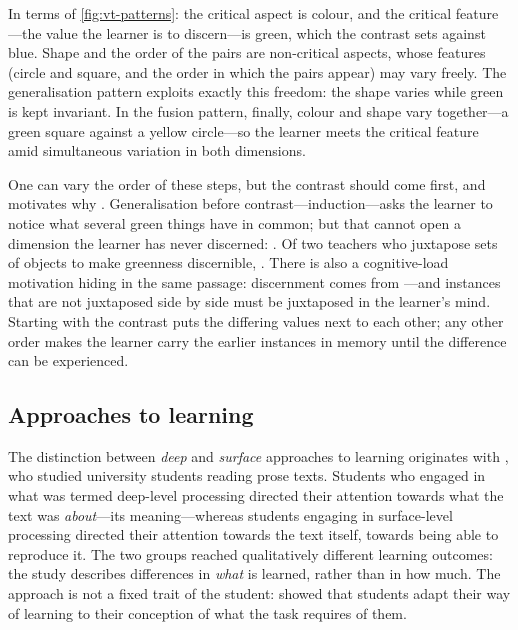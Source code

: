 In terms of \cref{fig:vt-patterns}: the critical aspect is colour, and the critical
feature---the value the learner is to discern---is green, which the
contrast sets against blue.
Shape and the order of the pairs are non-critical aspects, whose features
(circle and square, and the order in which the pairs appear) may vary freely.
The generalisation pattern exploits exactly this freedom: the shape varies
while green is kept invariant.
In the fusion pattern, finally, colour and shape vary together---a green
square against a yellow circle---so the learner meets the critical feature
amid simultaneous variation in both dimensions.

One can vary the order of these steps, but the contrast should come first,
and \citeauthor{NCOL} motivates why \autocite[pp.~45--47]{NCOL}.
Generalisation before contrast---induction---asks the learner to notice
what several green things have in common; but that cannot open a dimension
the learner has never discerned:
.
Of two teachers who juxtapose sets of objects to make greenness discernible,
.
There is also a cognitive-load motivation hiding in the same passage:
discernment comes from
---and instances that are not juxtaposed
side by side must be juxtaposed in the learner's mind.
Starting with the contrast puts the differing values next to each other;
any other order makes the learner carry the earlier instances in memory
until the difference can be experienced.

\subsection{Approaches to learning}
\label{approaches}

The distinction between \emph{deep} and \emph{surface} approaches to learning
originates with \textcite{MartonSaljo1976I}, who studied university students
reading prose texts.
Students who engaged in what was termed deep-level processing directed their
attention towards what the text was \emph{about}---its meaning---whereas
students engaging in surface-level processing directed their attention towards
the text itself, towards being able to reproduce it.
The two groups reached qualitatively different learning outcomes: the study
describes differences in \emph{what} is learned, rather than in how much.
The approach is not a fixed trait of the student:
\textcite{MartonSaljo1976II} showed that students adapt their way of learning
to their conception of what the task requires of them.

